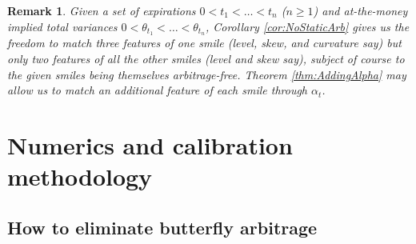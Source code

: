 \documentclass[12pt]{article}
\newtheorem{lemma}{Lemma}[section]
\newtheorem{remark}{Remark}[section]
\numberwithin{equation}{section}
\newcommand{\p}{\partial}
\begin{document}

\begin{remark}
Given a set of expirations $0< t_1<\ldots<t_n$ ($n\geq 1$) and at-the-money implied total variances $0< \theta_{t_1}<\ldots<\theta_{t_n}$, Corollary \ref{cor:NoStaticArb} gives us the freedom to match three features of one smile (level, skew, and curvature say) but only two features of all the other smiles (level and skew say), subject of course to the given smiles being themselves arbitrage-free.  Theorem \ref{thm:AddingAlpha} may allow us to match an additional feature of each smile through $\alpha_t$.
\end{remark}



\section{Numerics and calibration methodology}\label{sec:calibration}
\subsection{How to eliminate butterfly arbitrage}
\end{document}
